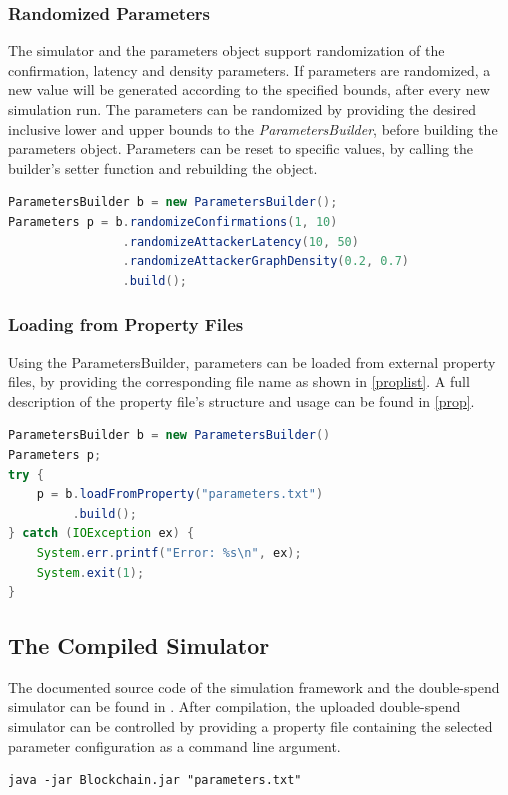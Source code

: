 \documentclass[a4paper,12pt,twoside]{report}
\begin{document}
\subsubsection{Randomized Parameters}
The simulator and the parameters object support randomization of the confirmation, latency and density parameters. If parameters are randomized, a new value will be generated according to the specified bounds, after every new simulation run. The parameters can be randomized by providing the desired inclusive lower and upper bounds to the \textit{ParametersBuilder}, before building the parameters object. Parameters can be reset to specific values, by calling the builder's setter function and rebuilding the object.
\begin{lstlisting}[language=Java, caption=Randomizing parameters using the ParametersBuilder]
ParametersBuilder b = new ParametersBuilder();
Parameters p = b.randomizeConfirmations(1, 10)
                .randomizeAttackerLatency(10, 50)
                .randomizeAttackerGraphDensity(0.2, 0.7)
                .build();
\end{lstlisting}
\subsubsection{Loading from Property Files}
Using the ParametersBuilder, parameters can be loaded from external property files, by providing the corresponding file name as shown in \autoref{proplist}. A full description of the property file's structure and usage can be found in \autoref{prop}.

\begin{lstlisting}[language=Java, caption=Loading parameters from property file,label=proplist]
ParametersBuilder b = new ParametersBuilder()
Parameters p;
try {
	p = b.loadFromProperty("parameters.txt")
	     .build();
} catch (IOException ex) {
	System.err.printf("Error: %s\n", ex);
	System.exit(1);
}
\end{lstlisting}
\subsection{The Compiled Simulator}
The documented source code of the simulation framework and the double-spend simulator can be found in \cite{github}. After compilation, the uploaded double-spend simulator can be controlled by providing a property file containing the selected parameter configuration as a command line argument.
\begin{lstlisting}[caption=Launching the simulator from the command line,label=cmd]
java -jar Blockchain.jar "parameters.txt"
\end{lstlisting}
\end{document}

